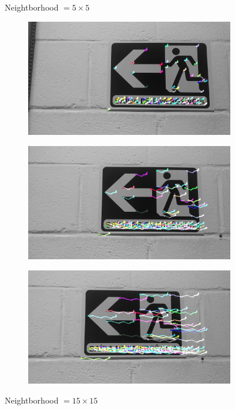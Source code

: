 \begin{figure}[!h]
    \caption{Neightborhood $= 5 \times 5$}
    \label{fig:comparison-neigh-pyramid1}
\end{figure}

\begin{figure}[!h]
   \hspace{-1cm}
    \centering
	\begin{subfigure}{0.33\textwidth}
	  \centering
	  \includegraphics[width=0.99\linewidth]{figs/flow15x15-1.jpg}
	\end{subfigure}%
	\begin{subfigure}{0.33\textwidth}
	  \centering
	  \includegraphics[width=0.99\linewidth]{figs/flow15x15-2.jpg}
	\end{subfigure}%
	\begin{subfigure}{0.33\textwidth}
        \centering
      \includegraphics[width=0.99\linewidth]{figs/flow15x15-3.jpg}
    \end{subfigure}

    \endminipage\hfill
        \caption{Neightborhood $= 15 \times 15$}
    \label{fig:comparison-neigh-pyramid2}
\end{figure}

